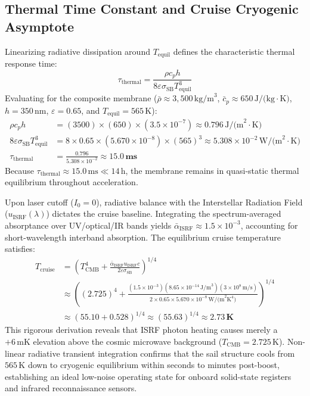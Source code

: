 \documentclass[11pt, a4paper]{article}
\begin{document}
\subsection{Thermal Time Constant and Cruise Cryogenic Asymptote}
Linearizing radiative dissipation around $T_{\text{equil}}$ defines the characteristic thermal response time:
\begin{equation}
    \tau_{\text{thermal}} = \frac{\rho c_p h}{8 \varepsilon \sigma_{\text{SB}} T_{\text{equil}}^3}
\end{equation}
Evaluating for the composite membrane ($\bar{\rho} \approx 3,500\,\text{kg/m}^3$, $\bar{c}_p \approx 650\,\text{J/(kg}\cdot\text{K)}$, $h = 350\,\text{nm}$, $\varepsilon = 0.65$, and $T_{\text{equil}} = 565\,\text{K}$):
\begin{align}
    \rho c_p h &= (3500) \times (650) \times (3.5 \times 10^{-7}) \approx 0.796\,\text{J/(m}^2\cdot\text{K)} \\
    8 \varepsilon \sigma_{\text{SB}} T_{\text{equil}}^3 &= 8 \times 0.65 \times (5.670 \times 10^{-8}) \times (565)^3 \approx 5.308 \times 10^{-2}\,\text{W/(m}^2\cdot\text{K)} \\
    \tau_{\text{thermal}} &= \frac{0.796}{5.308 \times 10^{-2}} \approx \mathbf{15.0\,\text{ms}}
\end{align}
Because $\tau_{\text{thermal}} \approx 15.0\,\text{ms} \ll 14\,\text{h}$, the membrane remains in quasi-static thermal equilibrium throughout acceleration.

Upon laser cutoff ($I_0 = 0$), radiative balance with the Interstellar Radiation Field ($u_{\text{ISRF}}(\lambda)$) dictates the cruise baseline. Integrating the spectrum-averaged absorptance over UV/optical/IR bands yields $\bar{\alpha}_{\text{ISRF}} \approx 1.5 \times 10^{-3}$, accounting for short-wavelength interband absorption. The equilibrium cruise temperature satisfies:
\begin{align}
    T_{\text{cruise}} &= \left( T_{\text{CMB}}^4 + \frac{\bar{\alpha}_{\text{ISRF}} u_{\text{ISRF}} c}{2 \varepsilon \sigma_{\text{SB}}} \right)^{1/4} \nonumber \\
    &\approx \left( (2.725)^4 + \frac{(1.5 \times 10^{-3})(8.65 \times 10^{-14}\,\text{J/m}^3)(3 \times 10^8\,\text{m/s})}{2 \times 0.65 \times 5.670 \times 10^{-8}\,\text{W/(m}^2\text{K}^4)} \right)^{1/4} \nonumber \\
    &\approx \left( 55.10 + 0.528 \right)^{1/4} \approx (55.63)^{1/4} \approx \mathbf{2.73\,\text{K}}
\end{align}
This rigorous derivation reveals that ISRF photon heating causes merely a $+6\,\text{mK}$ elevation above the cosmic microwave background ($T_{\text{CMB}} = 2.725\,\text{K}$). Non-linear radiative transient integration confirms that the sail structure cools from $565\,\text{K}$ down to cryogenic equilibrium within seconds to minutes post-boost, establishing an ideal low-noise operating state for onboard solid-state registers and infrared reconnaissance sensors.
\end{document}
